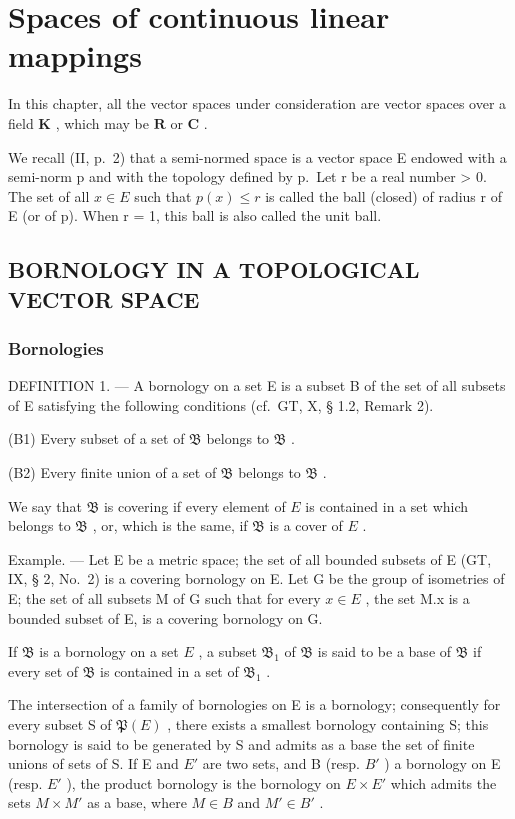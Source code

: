 \chapter{Spaces of continuous linear mappings}

In this chapter, all the vector spaces under consideration are vector spaces over a field \(\mathbf{K}\) , which may be \(\mathbf{R}\) or \(\mathbf{C}\) .

We recall (II, p.~2) that a semi-normed space is a vector space E endowed with a semi-norm p and with the topology defined by p.~Let r be a real number \textgreater{} 0. The set of all \(x \in E\) such that \(p(x) \leqslant r\) is called the ball (closed) of radius r of E (or of p). When r = 1, this ball is also called the unit ball.

\section{BORNOLOGY IN A TOPOLOGICAL VECTOR SPACE}

\subsection{Bornologies}

DEFINITION 1. --- A bornology on a set E is a subset B of the set of all subsets of E satisfying the following conditions (cf.~GT, X, § 1.2, Remark 2).

(B1) Every subset of a set of \(\mathfrak{B}\) belongs to \(\mathfrak{B}\) .

(B2) Every finite union of a set of \(\mathfrak{B}\) belongs to \(\mathfrak{B}\) .

We say that \(\mathfrak{B}\) is covering if every element of \(E\) is contained in a set which belongs to \(\mathfrak{B}\) , or, which is the same, if \(\mathfrak{B}\) is a cover of \(E\) .

Example. --- Let E be a metric space; the set of all bounded subsets of E (GT, IX, § 2, No.~2) is a covering bornology on E. Let G be the group of isometries of E; the set of all subsets M of G such that for every \(x \in E\) , the set M.x is a bounded subset of E, is a covering bornology on G.

If \(\mathfrak{B}\) is a bornology on a set \(E\) , a subset \(\mathfrak{B}_1\) of \(\mathfrak{B}\) is said to be a base of \(\mathfrak{B}\) if every set of \(\mathfrak{B}\) is contained in a set of \(\mathfrak{B}_1\) .

The intersection of a family of bornologies on E is a bornology; consequently for every subset S of \(\mathfrak{P}(E)\) , there exists a smallest bornology containing S; this bornology is said to be generated by S and admits as a base the set of finite unions of sets of S. If E and \(E'\) are two sets, and B (resp. \(B'\) ) a bornology on E (resp. \(E'\) ), the product bornology is the bornology on \(E \times E'\) which admits the sets \(M \times M'\) as a base, where \(M \in B\) and \(M' \in B'\) .

